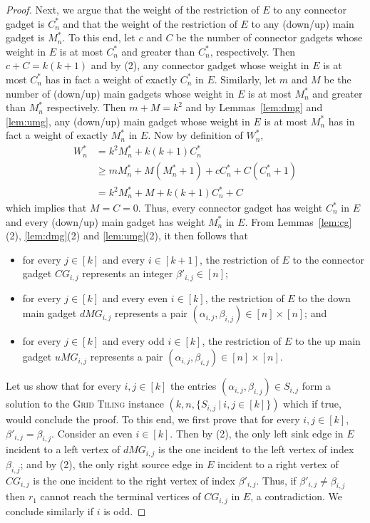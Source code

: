 \begin{proof}
Next, we argue that the weight of the restriction of $E$ to any connector gadget is $C_n^*$ and that the weight of the restriction of $E$ to any (down/up) main gadget is $M_n^*$. To this end, let $c$ and $C$ be the number of connector gadgets whose weight in $E$ is at most $C_n^*$ and greater than $C_n^*$, respectively. Then $c+C=k(k+1)$ and by (2), any connector gadget whose weight in $E$ is at most $C_n^*$ has in fact a weight of exactly $C_n^*$ in $E$. Similarly, let $m$ and $M$ be the number of (down/up) main gadgets whose weight in $E$ is at most $M_n^*$ and greater than $M_n^*$ respectively. Then $m + M = k^2$ and by Lemmas~\ref{lem:dmg} and \ref{lem:umg}, any (down/up) main gadget whose weight in $E$ is at most $M_n^*$ has in fact a weight of exactly $M_n^*$ in $E$. Now by definition of $W_n^*$, 
\begin{equation*}
\begin{split}
W_n^*& = k^2M_n^* + k(k+1)C_n^*\\
& \geq mM_n^* + M(M_n^*+1) + cC_n^* + C(C_n^*+1)\\
& = k^2M_n^* + M + k(k+1)C_n^* + C
\end{split}
\end{equation*}  
which implies that $M = C = 0$. Thus, every connector gadget has weight $C_n^*$ in $E$ and every (down/up) main gadget has weight $M_n^*$ in $E$. From Lemmas~\ref{lem:cg}(2), \ref{lem:dmg}(2) and \ref{lem:umg}(2), it then follows that
\begin{itemize}
\item for every $j \in [k]$ and every $i \in [k+1]$, the restriction of $E$ to the connector gadget $CG_{i,j}$ represents an integer $\beta'_{i,j} \in [n]$;
\item for every $j \in [k]$ and every even $i \in [k]$, the restriction of $E$ to the down main gadget $dMG_{i,j}$ represents a pair $(\alpha_{i,j},\beta_{i,j}) \in [n] \times [n]$; and
\item for every $j \in [k]$ and every odd $i \in [k]$, the restriction of $E$ to the up main gadget $uMG_{i,j}$ represents a pair $(\alpha_{i,j},\beta_{i,j}) \in [n] \times [n]$.
\end{itemize}
Let us show that for every $i,j \in [k]$ the entries $(\alpha_{i,j},\beta_{i,j}) \in S_{i,j}$ form a solution to the \textsc{Grid Tiling} instance $(k,n,\{S_{i,j}~|~i,j \in [k]\})$ which if true, would conclude the proof. To this end, we first prove that for every $i,j \in [k]$, $\beta'_{i,j} = \beta_{i,j}$. Consider an even $i \in [k]$. Then by (2), the only left sink edge in $E$ incident to a left vertex of $dMG_{i,j}$ is the one incident to the left vertex of index $\beta_{i,j}$; and by (2), the only right source edge in $E$ incident to a right vertex of $CG_{i,j}$ is the one incident to the right vertex of index $\beta'_{i,j}$. Thus, if $\beta'_{i,j} \neq \beta_{i,j}$ then $r_1$ cannot reach the terminal vertices of $CG_{i,j}$ in $E$, a contradiction. We conclude similarly if $i$ is odd. 


\end{proof}
